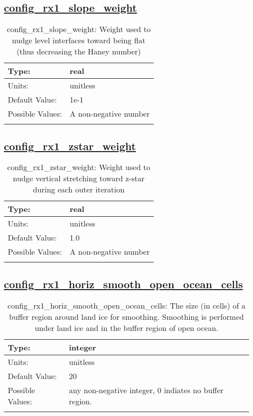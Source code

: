 \subsection[config\_rx1\_slope\_weight]{\hyperref[sec:nm_tab_constrain_Haney_number]{config\_rx1\_slope\_weight}}
\label{subsec:nm_sec_config_rx1_slope_weight}
\begin{center}
\begin{longtable}{| p{2.0in} || p{4.0in} |}
    \hline
    Type: & real \\
    \hline
    Units: & \si{unitless} \\
    \hline
    Default Value: & 1e-1 \\
    \hline
    Possible Values: & A non-negative number \\
    \hline
    \caption{config\_rx1\_slope\_weight: Weight used to nudge level interfaces toward being flat (thus decreasing the Haney number)}
\end{longtable}
\end{center}
\subsection[config\_rx1\_zstar\_weight]{\hyperref[sec:nm_tab_constrain_Haney_number]{config\_rx1\_zstar\_weight}}
\label{subsec:nm_sec_config_rx1_zstar_weight}
\begin{center}
\begin{longtable}{| p{2.0in} || p{4.0in} |}
    \hline
    Type: & real \\
    \hline
    Units: & \si{unitless} \\
    \hline
    Default Value: & 1.0 \\
    \hline
    Possible Values: & A non-negative number \\
    \hline
    \caption{config\_rx1\_zstar\_weight: Weight used to nudge vertical stretching toward z-star during each outer iteration}
\end{longtable}
\end{center}
\subsection[config\_rx1\_horiz\_smooth\_open\_ocean\_cells]{\hyperref[sec:nm_tab_constrain_Haney_number]{config\_rx1\_horiz\_smooth\_open\_ocean\_cells}}
\label{subsec:nm_sec_config_rx1_horiz_smooth_open_ocean_cells}
\begin{center}
\begin{longtable}{| p{2.0in} || p{4.0in} |}
    \hline
    Type: & integer \\
    \hline
    Units: & \si{unitless} \\
    \hline
    Default Value: & 20 \\
    \hline
    Possible Values: & any non-negative integer, 0 indiates no buffer region. \\
    \hline
    \caption{config\_rx1\_horiz\_smooth\_open\_ocean\_cells: The size (in cells) of a buffer region around land ice for smoothing.  Smoothing is performed under land ice and in the buffer region of open ocean.}
\end{longtable}
\end{center}
